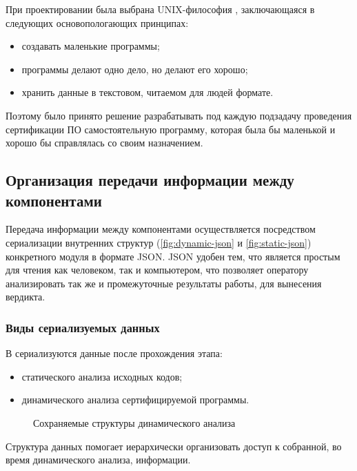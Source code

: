 При проектировании {\ProgModule} была выбрана UNIX-философия \autocite{unix-philosophy},
заключающаяся в следующих основопологающих принципах:
\begin{itemize}
    \item создавать маленькие программы;
    \item программы делают одно дело, но делают его хорошо;
    \item хранить данные в текстовом, читаемом для людей формате.
\end{itemize}

Поэтому было принято решение разрабатывать под каждую подзадачу проведения сертификации ПО
самостоятельную программу, которая была бы маленькой и хорошо бы справлялась со своим назначением.

\subsection{Организация передачи информации между компонентами {\ProgModule}}\label{sec:ch2/sec2/sub1}
Передача информации между компонентами {\ProgModule} осуществляется посредством
сериализации внутренних структур (\autoref{fig:dynamic-json} и \autoref{fig:static-json})
конкретного модуля в формате JSON. JSON удобен тем, что является простым для 
чтения как человеком, так и компьютером, что позволяет оператору 
анализировать так же и промежуточные результаты работы, для
вынесения вердикта.

\subsubsection{Виды сериализуемых данных}\label{sec:ch2/sec2/sub1/sub1}
В {\ProgModule} сериализуются данные после прохождения этапа:
\begin{itemize}
    \item статического анализа исходных кодов;
    \item динамического анализа сертифицируемой программы.
\end{itemize}

\begin{figure}[!htbp]
    \centerfloat{
        
    }
    \caption{Сохраняемые структуры динамического анализа \label{fig:dynamic-json}}
\end{figure}

Структура данных помогает иерархически организовать доступ к собранной, во время
динамического анализа, информации.


